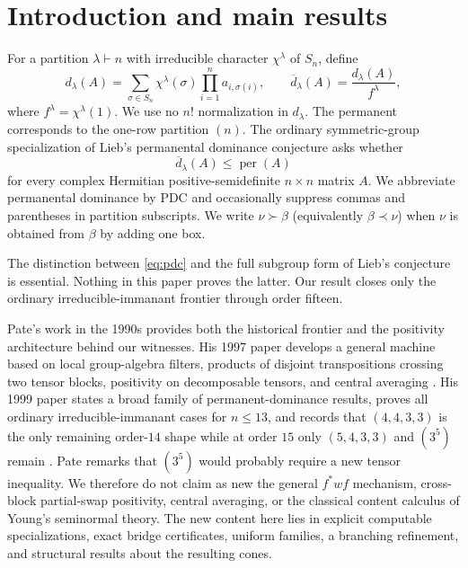 \documentclass[11pt]{article}
\theoremstyle{definition}
\newcommand{\per}{\operatorname{per}}
\newcommand{\dbar}{\overline d}
\newcommand{\youngcovers}{\succ}
\newcommand{\youngcovered}{\prec}
\begin{document}
\section{Introduction and main results}
For a partition $\lambda\vdash n$ with irreducible character $\chi^\lambda$ of $S_n$, define
\begin{equation}\label{eq:immanant}
 d_\lambda(A)=\sum_{\sigma\in S_n}\chi^\lambda(\sigma)\prod_{i=1}^n a_{i,\sigma(i)},
 \qquad \dbar_\lambda(A)=\frac{d_\lambda(A)}{f^\lambda},
\end{equation}
where $f^\lambda=\chi^\lambda(1)$.  We use no $n!$ normalization in $d_\lambda$.  The permanent corresponds to the one-row partition $(n)$.  The ordinary symmetric-group specialization of Lieb's permanental dominance conjecture \cite{Lieb1966} asks whether
\begin{equation}\label{eq:pdc}
 \dbar_\lambda(A)\le \per(A)
\end{equation}
for every complex Hermitian positive-semidefinite $n\times n$ matrix $A$.  We abbreviate permanental dominance by PDC and occasionally suppress commas and parentheses in partition subscripts.  We write $\nu\youngcovers\beta$ (equivalently $\beta\youngcovered\nu$) when $\nu$ is obtained from $\beta$ by adding one box.

The distinction between \eqref{eq:pdc} and the full subgroup form of Lieb's conjecture is essential.  Nothing in this paper proves the latter.  Our result closes only the ordinary irreducible-immanant frontier through order fifteen.

Pate's work in the 1990s provides both the historical frontier and the positivity architecture behind our witnesses.  His 1997 paper develops a general machine based on local group-algebra filters, products of disjoint transpositions crossing two tensor blocks, positivity on decomposable tensors, and central averaging \cite{Pate1997}.  His 1999 paper states a broad family of permanent-dominance results, proves all ordinary irreducible-immanant cases for $n\le13$, and records that $(4,4,3,3)$ is the only remaining order-$14$ shape while at order $15$ only $(5,4,3,3)$ and $(3^5)$ remain \cite{Pate1999}.  Pate remarks that $(3^5)$ would probably require a new tensor inequality.  We therefore do not claim as new the general $f^*wf$ mechanism, cross-block partial-swap positivity, central averaging, or the classical content calculus of Young's seminormal theory.  The new content here lies in explicit computable specializations, exact bridge certificates, uniform families, a branching refinement, and structural results about the resulting cones.
\end{document}
